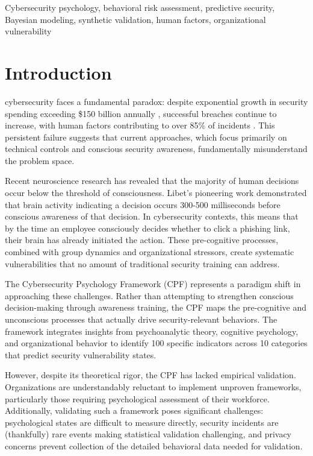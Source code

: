 \documentclass[10pt,twocolumn]{IEEEtran}
\begin{document}
\begin{IEEEkeywords}
Cybersecurity psychology, behavioral risk assessment, predictive security, Bayesian modeling, synthetic validation, human factors, organizational vulnerability
\end{IEEEkeywords}

\section{Introduction}
 cybersecurity faces a fundamental paradox: despite exponential growth in security spending exceeding \$150 billion annually \cite{gartner2023}, successful breaches continue to increase, with human factors contributing to over 85\% of incidents \cite{verizon2023}. This persistent failure suggests that current approaches, which focus primarily on technical controls and conscious security awareness, fundamentally misunderstand the problem space.

Recent neuroscience research has revealed that the majority of human decisions occur below the threshold of consciousness. Libet's pioneering work \cite{libet1983} demonstrated that brain activity indicating a decision occurs 300-500 milliseconds before conscious awareness of that decision. In cybersecurity contexts, this means that by the time an employee consciously decides whether to click a phishing link, their brain has already initiated the action. These pre-cognitive processes, combined with group dynamics and organizational stressors, create systematic vulnerabilities that no amount of traditional security training can address.

The Cybersecurity Psychology Framework (CPF) \cite{canale2024} represents a paradigm shift in approaching these challenges. Rather than attempting to strengthen conscious decision-making through awareness training, the CPF maps the pre-cognitive and unconscious processes that actually drive security-relevant behaviors. The framework integrates insights from psychoanalytic theory, cognitive psychology, and organizational behavior to identify 100 specific indicators across 10 categories that predict security vulnerability states.

However, despite its theoretical rigor, the CPF has lacked empirical validation. Organizations are understandably reluctant to implement unproven frameworks, particularly those requiring psychological assessment of their workforce. Additionally, validating such a framework poses significant challenges: psychological states are difficult to measure directly, security incidents are (thankfully) rare events making statistical validation challenging, and privacy concerns prevent collection of the detailed behavioral data needed for validation.
\end{document}
